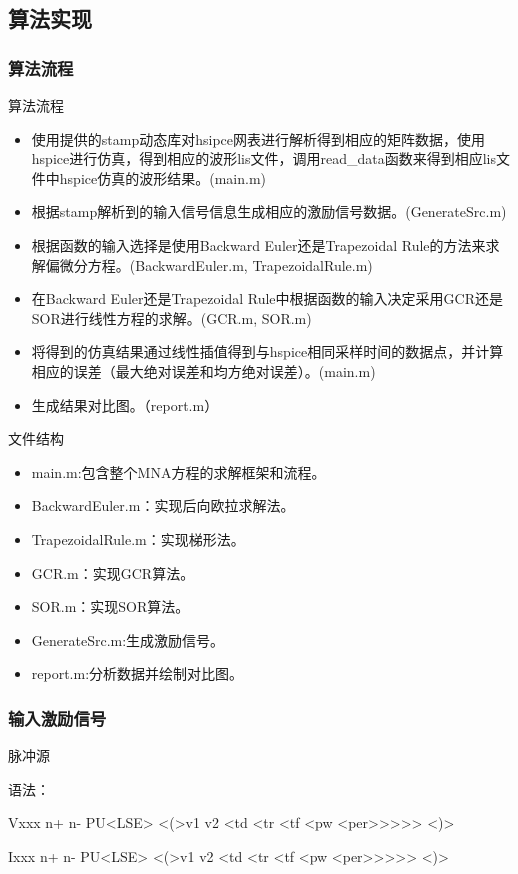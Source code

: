 \documentclass[12pt]{article}
\begin{document}
\subsection{算法实现}

\subsubsection{算法流程}
\qquad 算法流程
\begin{itemize}
  \item 使用提供的stamp动态库对hsipce网表进行解析得到相应的矩阵数据，使用hspice进行仿真，得到相应的波形lis文件，调用read_data函数来得到相应lis文件中hspice仿真的波形结果。(main.m)
  \item 根据stamp解析到的输入信号信息生成相应的激励信号数据。(GenerateSrc.m)
  \item 根据函数的输入选择是使用Backward Euler还是Trapezoidal Rule的方法来求解偏微分方程。(BackwardEuler.m, TrapezoidalRule.m)
  \item 在Backward Euler还是Trapezoidal Rule中根据函数的输入决定采用GCR还是SOR进行线性方程的求解。(GCR.m, SOR.m)
  \item 将得到的仿真结果通过线性插值得到与hspice相同采样时间的数据点，并计算相应的误差（最大绝对误差和均方绝对误差）。(main.m)
  \item 生成结果对比图。（report.m）
\end{itemize}

\qquad 文件结构
\begin{itemize}
  \item main.m:包含整个MNA方程的求解框架和流程。
  \item BackwardEuler.m：实现后向欧拉求解法。
  \item TrapezoidalRule.m：实现梯形法。
  \item GCR.m：实现GCR算法。
  \item SOR.m：实现SOR算法。
  \item GenerateSrc.m:生成激励信号。
  \item report.m:分析数据并绘制对比图。
\end{itemize}

\subsubsection{输入激励信号}
\qquad 脉冲源

语法：

Vxxx n+ n- PU<LSE> <(>v1 v2 <td <tr <tf <pw <per>>>>> <)>

Ixxx n+ n- PU<LSE> <(>v1 v2 <td <tr <tf <pw <per>>>>> <)>
\end{document}
